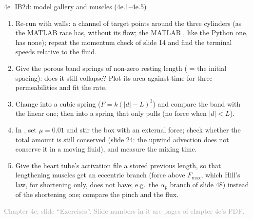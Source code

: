 \documentclass[aspectratio=169,11pt]{beamer}
\newcommand{\sourcecredit}[1]{\vfill\begin{flushright}\tiny\textcolor{DarkGray}{#1}\end{flushright}}
\begin{document}
\begin{frame}{4e\,\textbullet\ IB2d: model gallery and muscles (4e.1--4e.5)}
\label{fr:c4ex1}
\small
\begin{enumerate}
  \item[4e.1] Re-run  with walls: a channel of target points around the three cylinders (as the MATLAB  race has, without its flow; the MATLAB , like the Python one, has none); repeat the momentum check of slide 14 and find the terminal speeds relative to the fluid.
  \item[4e.2] Give the porous band springs of non-zero resting length ( = the initial spacing): does it still collapse? Plot its area against time for three permeabilities and fit the rate.
  \item[4e.3] Change  into a cubic spring ($F = k(|d| - L)^3$) and compare the band with the linear one; then into a spring that only pulls (no force when $|d| < L$).
  \item[4e.4] In , set $\mu = 0.01$ and stir the box with an external force; check whether the total amount is still conserved (slide 24: the upwind advection does not conserve it in a moving fluid), and measure the mixing time.
  \item[4e.5] Give the heart tube's activation file a stored previous length, so that lengthening muscles get an eccentric branch (force above $F_{\max}$, which Hill's law, for shortening only, does not have; e.g.\ the $\alpha_p$ branch of slide 48) instead of the shortening one; compare the pinch and the flux.
\end{enumerate}
\sourcecredit{Chapter 4e, slide ``Exercises''. Slide numbers in it are pages of chapter 4e's PDF.}
\end{frame}
\end{document}
